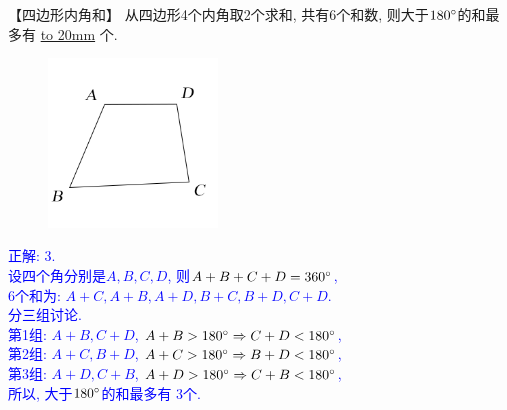 \item {
    【四边形内角和】
    从四边形4个内角取2个求和, 共有6个和数, 则大于$180\degree$的和最多有 \underline{\hbox to 20mm{}} 个.
    \begin{figure}[H] 
        \centering
        \includegraphics[width=0.4\textwidth]{./pics/Chapter_2/11.png}
    \end{figure}
    \ifshowSolution 
        \fangsong{}\textcolor{blue}{
            正解: 3.\\
            设四个角分别是$A,B,C,D$, 则$A+B+C+D = 360\degree$, \\
            6个和为: $A+C, A+B, A+D, B+C, B+D, C+D$. \\
            分三组讨论.\\
            第1组: $A+B, C+D$, $A+B > 180\degree \Rightarrow C+D < 180\degree$, \\
            第2组: $A+C,B+D$, $A+C > 180\degree \Rightarrow B+D < 180\degree$, \\
            第3组: $A+D,C+B$, $A+D > 180\degree \Rightarrow C+B < 180\degree$, \\
            所以, 大于$180\degree$的和最多有 3个.
        }
    \else
        \vspace{1cm}
    \fi
}


